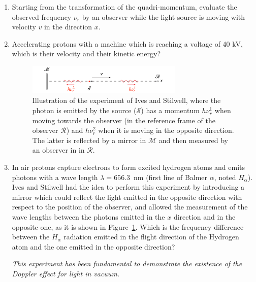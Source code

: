 \begin{enumerate}

\item Starting from the transformation of the quadri-momentum, evaluate the observed frequency $\nu_r$ by an observer while the light source is moving with velocity $v$ in the direction $x$.

\item Accelerating protons with a machine which is reaching a voltage of 40 kV, which is their velocity and their kinetic energy?

\begin{figure}[ht]
\centering
\includegraphics[width=0.7\textwidth]{Figures/Scritto-Id.pdf}
\vskip -0.2cm
\caption{\label{Doppler3} Illustration of the experiment of Ives and Stilwell, where the photon is emitted by the source ($\mathcal{S}$) has a momentum $h\nu_r^1$ when moving towards the observer (in the reference frame of the observer $\mathcal{R}$) and $h\nu_r^2$ when it is moving in the opposite direction. The latter is reflected by a mirror in $\mathcal{M}$ and then measured by an observer in in $\mathcal{R}$.}
\end{figure}

\item In air protons capture electrons to form excited hydrogen atoms and emits photons with a wave length $\lambda = 656.3$~nm (first line of Balmer $\alpha$, noted $H_{\alpha}$). Ives and Stilwell had the idea to perform this experiment by introducing a mirror which could reflect the light emitted in the opposite direction with respect to the position of the observer, and allowed the measurement of the wave lengths between the photons emitted in the $x$ direction and in the opposite one, as it is shown in Figure~\ref{Doppler3}. Which is the frequency difference between the $H_{\alpha}$ radiation emitted in the flight direction of the Hydrogen atom and the one emitted in the opposite direction?

  \vspace{0.5cm}
  
  {\it This experiment has been fundamental to demonstrate the existence of the Doppler effect for light in vacuum.}\\


\end{enumerate}
